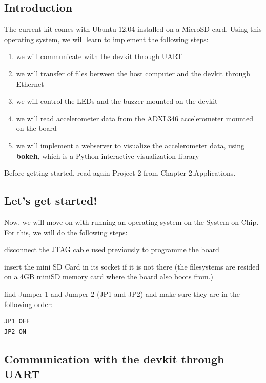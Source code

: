 \subsection{Introduction}

The current kit comes with Ubuntu 12.04 installed on a MicroSD card. Using this 
operating system, we will learn to implement the following steps:
\begin{enumerate}
\item we will communicate with the devkit through UART
\item we will transfer of files between the host computer and the devkit through Ethernet
\item we will control the LEDs and the buzzer mounted on the devkit
\item we will read accelerometer data from the ADXL346 accelerometer mounted on the board
\item we will implement a webserver to visualize the accelerometer data, using  \textbf{bokeh}, which is a Python interactive visualization library
\end{enumerate}

Before getting started, read again Project 2 from Chapter 2.Applications.


\subsection{Let's get started!}

Now, we will move on with running an operating system on the System on Chip. For this, we will do the following steps:
\begin{myitemize}
\item  disconnect the JTAG cable used previously to programme the board
\item insert the mini SD Card in its socket if it is not there (the filesystems are resided on a 4GB miniSD memory card where the board also boots from.)
\item find Jumper 1 and Jumper 2 (JP1 and JP2) and make sure they are in the following order:
\begin{verbatim}
JP1 OFF 
JP2 ON
\end{verbatim}
\end{myitemize}



\subsection{Communication with the devkit through UART}

